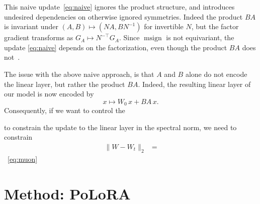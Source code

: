 \documentclass[11pt]{article}
\DeclareMathOperator{\polar}{msign}          %
\newcommand{\methodname}{PoLoRA\xspace}
\theoremstyle{plain}
\theoremstyle{definition}
\theoremstyle{remark}
\begin{document}
This naive update~\eqref{eq:naive} ignores the product structure, and introduces undesired dependencies on otherwise ignored symmetries. Indeed
the product $BA$ is invariant under $(A,B)\mapsto(NA,BN^{-1})$ for invertible $N$, but the factor gradient transforms as $G_A\mapsto N^{-\top}G_A$. Since $\polar$ is not equivariant, the update \eqref{eq:naive} depends on the factorization, even though the product $BA$ does not~\cite{imuon}.

The issue with the above naive approach, is that $A$ and $B$ alone do not encode the linear layer, but rather the product $BA$. 
Indeed, the resulting linear layer of our model is now encoded by
\begin{equation} \label{eq:lin-op}
    x \mapsto W_0 \,x + BA \,x.
\end{equation} 
Consequently, if we want to control the 

to constrain the update to the linear layer in the spectral norm, we need to constrain
\begin{align*}
    \| W-W_t\|_2 &= 
\end{align*}
~\eqref{eq:muon}
\section{Method: \methodname}
\label{sec:method}

\end{document}
